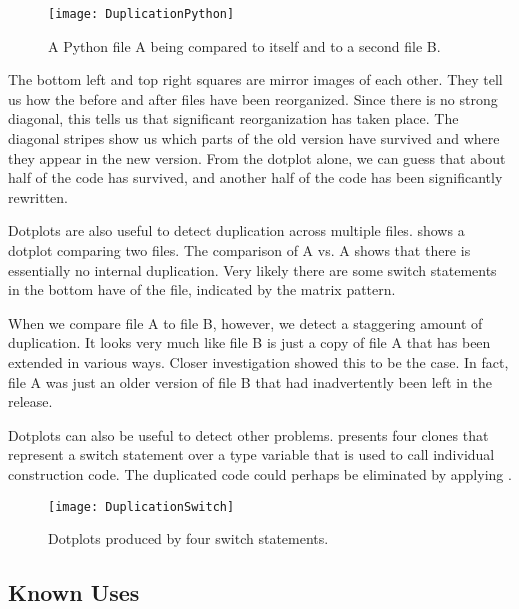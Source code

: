 \documentclass[a4paper,10pt,twoside]{book}
\begin{document}
\begin{figure}[h]
\begin{center}
\texttt{[image: DuplicationPython]}
\caption{A Python file A being compared to itself and to a second file B.}
\end{center}
\end{figure}

The bottom left and top right squares are mirror images of each other. They tell us how the before and after files have been reorganized. Since there is no strong diagonal, this tells us that significant reorganization has taken place. The diagonal stripes show us which parts of the old version have survived and where they appear in the new version. From the dotplot alone, we can guess that about half of the code has survived, and another half of the code has been significantly rewritten.

Dotplots are also useful to detect duplication across multiple files.  shows a dotplot comparing two  files. The comparison of A vs. A shows that there is essentially no internal duplication. Very likely there are some switch statements in the bottom have of the file, indicated by the matrix pattern.

When we compare file A to file B, however, we detect a staggering amount of duplication. It looks very much like file B is just a copy of file A that has been extended in various ways. Closer investigation showed this to be the case. In fact, file A was just an older version of file B that had inadvertently been left in the release.

Dotplots can also be useful to detect other problems.  presents four clones that represent a switch statement over a type variable that is used to call individual construction code. The duplicated code could perhaps be eliminated by applying .

\begin{figure}
\begin{center}
\texttt{[image: DuplicationSwitch]}
\caption{Dotplots produced by four switch statements.}
\end{center}
\end{figure}

\subsection*{Known Uses}
\end{document}
